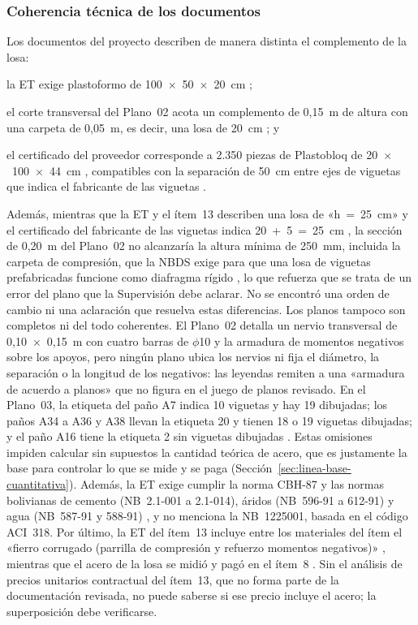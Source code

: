 \subsubsection{Coherencia técnica de los documentos}
Los documentos del proyecto describen de manera distinta el complemento de la losa:
\begin{enumerate*}[label=(\alph*)]
  \item la ET exige plastoformo de 100~$\times$~50~$\times$~20~cm \parencite[p.~3]{uatf_et};
  \item el corte transversal del Plano~02 acota un complemento de 0,15~m de altura con una carpeta de 0,05~m, es decir, una losa de 20~cm \parencite[Plano~02]{uatf_planos}; y
  \item el certificado del proveedor corresponde a 2.350 piezas de Plastobloq de 20~$\times$~100~$\times$~44~cm \parencite{unicon2025}, compatibles con la separación de 50~cm entre ejes de viguetas que indica el fabricante de las viguetas \parencite{pretensa2025}.
\end{enumerate*}
Además, mientras que la ET y el ítem~13 describen una losa de «h~=~25~cm» y el certificado del fabricante de las viguetas indica 20~+~5~=~25~cm \parencite{pretensa2025}, la sección de 0,20~m del Plano~02 no alcanzaría la altura mínima de 250~mm, incluida la carpeta de compresión, que la NBDS exige para que una losa de viguetas prefabricadas funcione como diafragma rígido \parencite[art.~12.I, inc.~b, p.~22]{mopsv2023nbds}, lo que refuerza que se trata de un error del plano que la Supervisión debe aclarar. No se encontró una orden de cambio ni una aclaración que resuelva estas diferencias. Los planos tampoco son completos ni del todo coherentes. El Plano~02 detalla un nervio transversal de 0,10~$\times$~0,15~m con cuatro barras de $\phi$10 y la armadura de momentos negativos sobre los apoyos, pero ningún plano ubica los nervios ni fija el diámetro, la separación o la longitud de los negativos: las leyendas remiten a una «armadura de acuerdo a planos» que no figura en el juego de planos revisado. En el Plano~03, la etiqueta del paño A7 indica 10 viguetas y hay 19 dibujadas; los paños A34 a A36 y A38 llevan la etiqueta 20 y tienen 18 o 19 viguetas dibujadas; y el paño A16 tiene la etiqueta 2 sin viguetas dibujadas \parencite{uatf_planos}. Estas omisiones impiden calcular sin supuestos la cantidad teórica de acero, que es justamente la base para controlar lo que se mide y se paga (Sección~\ref{sec:linea-base-cuantitativa}). Además, la ET exige cumplir la norma CBH-87 y las normas bolivianas de cemento (NB~2.1-001 a 2.1-014), áridos (NB~596-91 a 612-91) y agua (NB~587-91 y 588-91) \parencite[pp.~1--2]{uatf_et}, y no menciona la NB~1225001, basada en el código ACI~318. Por último, la ET del ítem~13 incluye entre los materiales del ítem el «fierro corrugado (parrilla de compresión y refuerzo momentos negativos)» \parencite[p.~3]{uatf_et}, mientras que el acero de la losa se midió y pagó en el ítem~8 \parencite[p.~20]{uatf2025pao2}. Sin el análisis de precios unitarios contractual del ítem~13, que no forma parte de la documentación revisada, no puede saberse si ese precio incluye el acero; la superposición debe verificarse.

